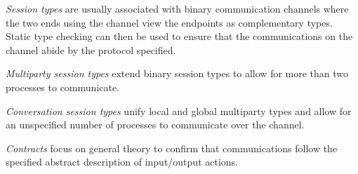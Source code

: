 \textit{Session types} are usually associated with binary communication channels where the two ends using the channel view the endpoints as complementary types. Static type checking can then be used to ensure that the communications on the channel abide by the protocol specified. 

\textit{Multiparty session types} extend binary session types to allow for more than two processes to communicate. 

\textit{Conversation session types} unify local and global multiparty types and allow for an unspecified number of processes to communicate over the channel. 

\textit{Contracts} focus on general theory to confirm that communications follow the specified abstract description of input/output actions.

